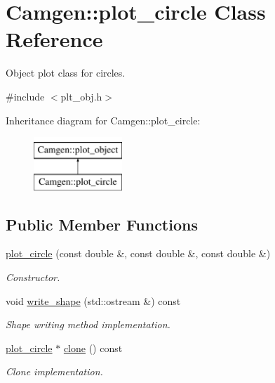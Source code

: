 \hypertarget{a00421}{\section{Camgen\-:\-:plot\-\_\-circle Class Reference}
\label{a00421}
}


Object plot class for circles.  




{\ttfamily \#include $<$plt\-\_\-obj.\-h$>$}

Inheritance diagram for Camgen\-:\-:plot\-\_\-circle\-:\begin{figure}[H]
\begin{center}
\leavevmode
\includegraphics[height=2.000000cm]{a00421}
\end{center}
\end{figure}
\subsection*{Public Member Functions}
\begin{DoxyCompactItemize}
\item 
\hypertarget{a00421_a5f91cab0cc15084ddf6d64d2b42357d0}{\hyperlink{a00421_a5f91cab0cc15084ddf6d64d2b42357d0}{plot\-\_\-circle} (const double \&, const double \&, const double \&)}\label{a00421_a5f91cab0cc15084ddf6d64d2b42357d0}

\begin{DoxyCompactList}\small\item\em Constructor. \end{DoxyCompactList}\item 
\hypertarget{a00421_add83473ec3905a07e09921c2e9f9633a}{void \hyperlink{a00421_add83473ec3905a07e09921c2e9f9633a}{write\-\_\-shape} (std\-::ostream \&) const }\label{a00421_add83473ec3905a07e09921c2e9f9633a}

\begin{DoxyCompactList}\small\item\em Shape writing method implementation. \end{DoxyCompactList}\item 
\hypertarget{a00421_adf58747fbdef62d6c40ea914ba9c792c}{\hyperlink{a00421}{plot\-\_\-circle} $\ast$ \hyperlink{a00421_adf58747fbdef62d6c40ea914ba9c792c}{clone} () const }\label{a00421_adf58747fbdef62d6c40ea914ba9c792c}

\begin{DoxyCompactList}\small\item\em Clone implementation. \end{DoxyCompactList}\end{DoxyCompactItemize}
